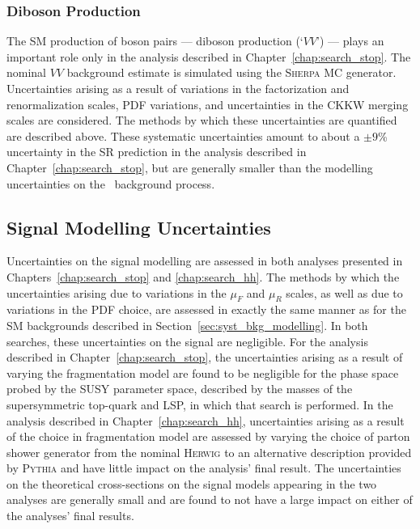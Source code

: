 \subsubsection{Diboson Production}

The SM production of boson pairs --- diboson production (`$VV$') --- plays an important role only in the
analysis described in Chapter~\ref{chap:search_stop}.
The nominal $VV$ background estimate is simulated using the \textsc{Sherpa} MC generator.
Uncertainties arising as a result of variations in the factorization and renormalization scales,
PDF variations, and uncertainties in the CKKW merging scales are considered.
The methods by which these uncertainties are quantified are described above.
These systematic uncertainties amount to about a $\pm 9$\% uncertainty in the SR prediction
in the analysis described in Chapter~\ref{chap:search_stop}, but are generally smaller than
the modelling uncertainties on the \ttbar~background process.

%
%

\subsection{Signal Modelling Uncertainties}
\label{sec:syst_sig_modelling}

Uncertainties on the signal modelling are assessed in both analyses presented in Chapters~\ref{chap:search_stop}
and \ref{chap:search_hh}.
The methods by which the uncertainties arising due to variations in the $\mu_F$ and $\mu_R$ scales, as
well as due to variations in the PDF choice, are assessed in exactly the same manner
as for the SM backgrounds described in Section~\ref{sec:syst_bkg_modelling}.
In both searches, these uncertainties on the signal are negligible.
For the analysis described in Chapter~\ref{chap:search_stop}, the uncertainties
arising as a result of varying the fragmentation model are found to be negligible for the
phase space probed by the SUSY parameter space, described by the masses of the supersymmetric
top-quark and LSP, in which that search is performed.
In the analysis described in Chapter~\ref{chap:search_hh}, uncertainties arising as a result of
the choice in fragmentation model are assessed by varying the choice of parton shower generator
from the nominal \textsc{Herwig} to an alternative description provided by \textsc{Pythia}
and have little impact on the analysis' final result.
The uncertainties on the theoretical cross-sections on the signal models appearing in the two analyses
are generally small and are found to not have a large impact on either of the analyses' final results.

